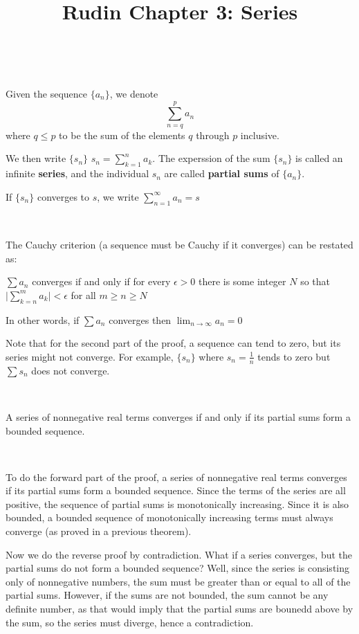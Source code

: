 \documentclass{article}
\title{Rudin Chapter 3: Series}
\begin{document}
\maketitle

\begin{definition}[Series]
\

Given the sequence $\{a_n\}$, we denote $$\sum_{n=q}^p a_n$$where $q\leq p$ to be the sum of the elements $q$ through $p$ inclusive. 

We then write $\{s_n\}$ $s_n = \sum_{k=1}^n a_k$. The experssion of the sum $\{s_n\}$ is called an infinite \textbf{series}, and the individual $s_n$ are called \textbf{partial sums} of $\{a_n\}$.

If $\{s_n\}$ converges to $s$, we write $\sum_{n=1}^\infty a_n = s$
\end{definition}

\begin{theorem}
\

The Cauchy criterion (a sequence must be Cauchy if it converges) can be restated as:

$\sum a_n$ converges if and only if for every $\epsilon >0$ there is some integer $N$ so that $\vert \sum_{k=n}^m a_k \vert < \epsilon$ for all $m \geq n \geq N$

In other words, if $\sum a_n$ converges then $\lim_{n\to \infty } a_n = 0$
\end{theorem}

Note that for the second part of the proof, a sequence can tend to zero, but its series might not converge. For example, $\{s_n\}$ where $s_n = \frac{1}{n}$ tends to zero but $\sum s_n$ does not converge.

\begin{theorem}
\

A series of nonnegative real terms converges if and only if its partial sums form a bounded sequence.
\end{theorem}

\begin{customproof}
\

To do the forward part of the proof, a series of nonnegative real terms converges if its partial sums form a bounded sequence. Since the terms of the series are all positive, the sequence of partial sums is monotonically increasing. Since it is also bounded, a bounded sequence of monotonically increasing terms must always converge (as proved in a previous theorem).

Now we do the reverse proof by contradiction. What if a series converges, but the partial sums do not form a bounded sequence? Well, since the series is consisting only of nonnegative numbers, the sum must be greater than or equal to all of the partial sums. However, if the sums are not bounded, the sum cannot be any definite number, as that would imply that the partial sums are bounedd above by the sum, so the series must diverge, hence a contradiction.
\end{customproof}
\end{document}
